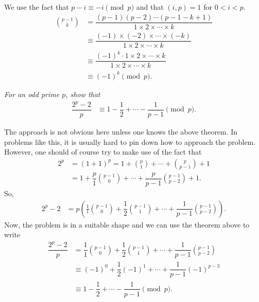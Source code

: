 \documentclass[12pt]{subfile}
\begin{document}
		\begin{solution}
			We use the fact that $p-i\equiv-i\pmod p$ and that $(i,p)=1$ for $0<i<p$.
				\begin{align*}
					\binom{p-1}{k}
						& = \dfrac{(p-1)(p-2)\cdots(p-1-k+1)}{1\times 2 \times \cdots \times k}\\
						& \equiv \dfrac{(-1) \times (-2) \times \cdots \times (-k)}{1\times 2 \times \cdots \times k}\\
						& \equiv\dfrac{(-1)^k \cdot 1\times 2 \times \cdots \times k}{1\times 2 \times \cdots \times k}\\
						& \equiv(-1)^k\pmod p.
				\end{align*}

		\end{solution}

		\begin{problem}\slshape
			For an odd prime $p$, show that
				\begin{align*}
					\dfrac{2^p-2}{p} & \equiv1-\dfrac{1}{2}+\cdots-\dfrac{1}{p-1}\pmod p.
				\end{align*}
		\end{problem}

		\begin{solution}
			The approach is not obvious here unless one knows the above theorem. In problems like this, it is usually hard to pin down how to approach the problem. However, one should of course try to make use of the fact that
				\begin{align*}
					2^p
						& = (1+1)^p = 1+\binom{p}{1}+\cdots+\binom{p}{p-1}+1\\
						& = 1+\dfrac{p}{1}\binom{p-1}{0}+\cdots+\dfrac{p}{p-1}\binom{p-1}{p-2}+1.
				\end{align*}
			So,
				\begin{align*}
					2^p-2
						& = p\left(\frac{1}{1}\binom{p-1}{0}+\dfrac{1}{2}\binom{p-1}{1}+\cdots+\dfrac{1}{p-1}\binom{p-1}{p-2}\right).
				\end{align*}
			Now, the problem is in a suitable shape and we can use the theorem above to write
				\begin{align*}
					\dfrac{2^p-2}{p}
						& = \dfrac{1}{1}\binom{p-1}{0}+\dfrac{1}{2}\binom{p-1}{1}+\cdots+\dfrac{1}{p-1}\binom{p-1}{p-2}\\
						& \equiv(-1)^0+\dfrac{1}{2}(-1)^1+\cdots+\dfrac{1}{p-1}(-1)^{p-3}\\
						& \equiv1-\dfrac{1}{2}+\cdots-\dfrac{1}{p-1}\pmod p.
				\end{align*}

		\end{solution}
\end{document}
